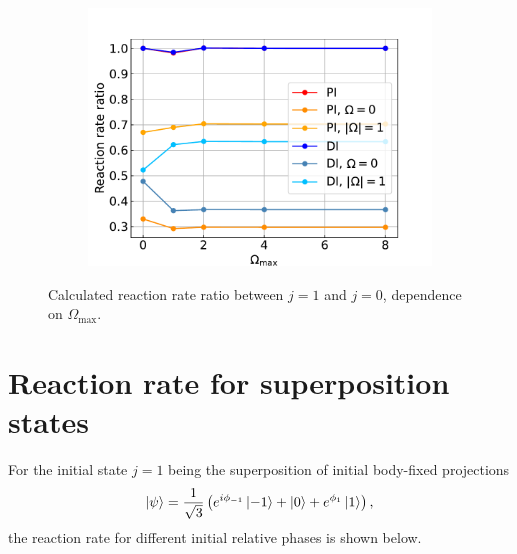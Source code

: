 \documentclass{article}
\begin{document}
    \begin{figure}[H]
        \centering
        \begin{subfigure}{.7\linewidth}
            \centering
            \includegraphics[width=\linewidth]{coriolis_rr_omega_maxes_ratio.pdf}
        \end{subfigure} 
        \caption{Calculated reaction rate ratio between $j = 1$ and $j = 0$, dependence on $\Omega_\text{max}$.}
    \end{figure}

\section{Reaction rate for superposition states}
    For the initial state $j = 1$ being the superposition of initial body-fixed projections
    \begin{equation}
        \ket{\psi} = \frac{1}{\sqrt{3}} \left(e^{i\phi_{-1}}\ket{-1} + \ket{0} + e^{\phi_1}\ket{1}\right),
    \end{equation}
    the reaction rate for different initial relative phases is shown below.
\end{document}
